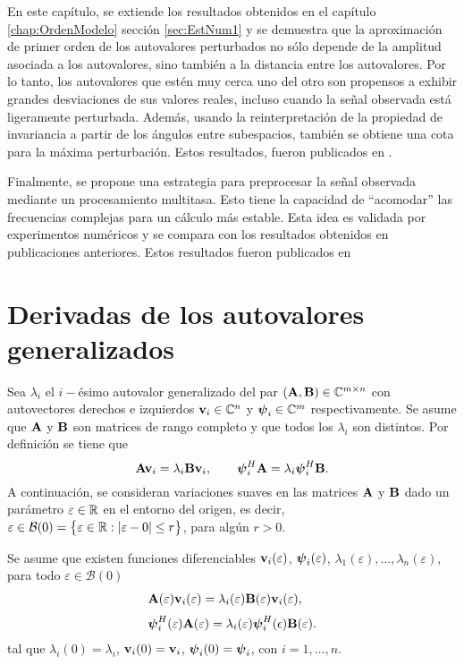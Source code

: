     En este capítulo, se extiende los resultados obtenidos en el capítulo \ref{chap:OrdenModelo} sección \ref{sec:EstNum1} y se demuestra que la aproximación de primer orden de los autovalores perturbados no sólo depende de la amplitud asociada a los autovalores, sino también a la distancia entre los autovalores. Por lo tanto, los autovalores que estén muy cerca uno del otro son propensos a exhibir grandes desviaciones de sus valores reales, incluso cuando la señal observada está ligeramente perturbada. Además, usando la reinterpretación de la propiedad de invariancia a partir de los ángulos entre subespacios, también se obtiene una cota para la máxima perturbación. Estos resultados, fueron publicados en \cite{Albert2020,ALBERT2023}.
    
    Finalmente, se propone una estrategia para preprocesar la señal observada mediante un procesamiento multitasa. Esto tiene la capacidad de ``acomodar'' las frecuencias complejas para un cálculo más estable. Esta idea es validada por experimentos numéricos y se compara con los resultados obtenidos en publicaciones anteriores. Estos resultados fueron publicados en \cite{Albert2020}
	
	\section{Derivadas de los autovalores generalizados}
	
		Sea $\lambda_i$ el $i-$ésimo autovalor generalizado del par $(\mathbf{A},\mathbf{B})\in\mathbb{C}^{m\times n}$ con autovectores derechos e izquierdos $\mathbf{v}_i\in\mathbb{C}^n$ y $\boldsymbol{\psi}_i\in\mathbb{C}^m$ respectivamente. Se asume que $\mathbf{A}$ y $\mathbf{B}$ son matrices de rango completo y que todos los $\lambda_i$ son distintos. Por definición se tiene que
		\begin{equation}
			\mathbf{A}\mathbf{v}_i = \lambda_i\mathbf{B}\mathbf{v}_i,\qquad \boldsymbol{\psi}_i^H\mathbf{A} = \lambda_i\boldsymbol{\psi}_i^H\mathbf{B}.
			\label{Eq:Estabilidad1}
		\end{equation}
		A continuación, se consideran variaciones suaves en las matrices $\mathbf{A}$ y $\mathbf{B}$  dado un parámetro $\varepsilon\in\mathbb{R}$ en el entorno del origen, es decir, $\varepsilon\in\mathcal{B}(0) = \big\{\varepsilon\in\mathbb{R}:|\varepsilon-0|\le r\big\}$, para algún $r>0$. 
	
		Se asume que existen funciones diferenciables $\mathbf{v}_i(\varepsilon)$, $\boldsymbol{\psi}_i(\varepsilon)$, $\lambda_1(\varepsilon),\ldots,\lambda_n(\varepsilon)$, para todo $\varepsilon\in\mathcal{B}(0)$
		\begin{equation}
			\begin{aligned} 
				& \mathbf{A}(\varepsilon)\mathbf{v}_i(\varepsilon) = \lambda_i(\varepsilon)\mathbf{B}(\varepsilon)\mathbf{v}_i(\varepsilon),\\[0.3em] 
                & \boldsymbol{\psi}_i^H(\varepsilon)\mathbf{A}(\varepsilon) = \lambda_i(\varepsilon)\boldsymbol{\psi}_i^H(\epsilon)\mathbf{B}(\varepsilon).
			\end{aligned}
			\label{Eq:Estabilidad2}
		\end{equation}
		tal que $\lambda_i(0) = \lambda_i$, $\mathbf{v}_i(0) = \mathbf{v}_i$, $\boldsymbol{\psi}_i(0) = \boldsymbol{\psi}_i$, con $i = 1,\ldots, n$.
	

